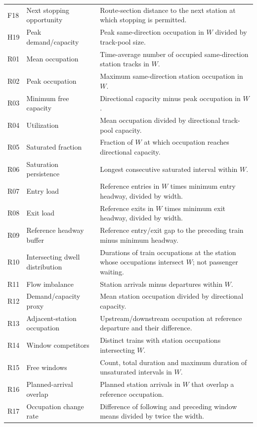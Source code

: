 \begin{longtable}{@{}>{\raggedright\arraybackslash}p{0.8cm}>{\raggedright\arraybackslash}p{3.7cm}>{\raggedright\arraybackslash}p{10.0cm}@{}}
F18 & Next stopping opportunity & Route-section distance to the next station at which stopping is permitted. \\
H19 & Peak demand/capacity & Peak same-direction occupation in $W$ divided by track-pool size. \\
R01 & Mean occupation & Time-average number of occupied same-direction station tracks in $W$. \\
R02 & Peak occupation & Maximum same-direction station occupation in $W$. \\
R03 & Minimum free capacity & Directional capacity minus peak occupation in $W$. \\
R04 & Utilization & Mean occupation divided by directional track-pool capacity. \\
R05 & Saturated fraction & Fraction of $W$ at which occupation reaches directional capacity. \\
R06 & Saturation persistence & Longest consecutive saturated interval within $W$. \\
R07 & Entry load & Reference entries in $W$ times minimum entry headway, divided by width. \\
R08 & Exit load & Reference exits in $W$ times minimum exit headway, divided by width. \\
R09 & Reference headway buffer & Reference entry/exit gap to the preceding train minus minimum headway. \\
R10 & Intersecting dwell distribution & Durations of train occupations at the station whose occupations intersect $W$; not passenger waiting. \\
R11 & Flow imbalance & Station arrivals minus departures within $W$. \\
R12 & Demand/capacity proxy & Mean station occupation divided by directional capacity. \\
R13 & Adjacent-station occupation & Upstream/downstream occupation at reference departure and their difference. \\
R14 & Window competitors & Distinct trains with station occupations intersecting $W$. \\
R15 & Free windows & Count, total duration and maximum duration of unsaturated intervals in $W$. \\
R16 & Planned-arrival overlap & Planned station arrivals in $W$ that overlap a reference occupation. \\
R17 & Occupation change rate & Difference of following and preceding window means divided by twice the width. \\

\end{longtable}

